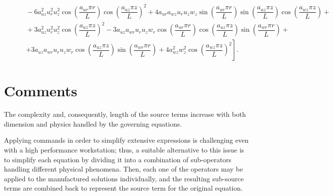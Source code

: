 \documentclass[10pt]{article}
\begin{document}
\begin{equation}
\begin{split}
    &\qquad-6 a_{uz}^2 u_r^2 u_z^2 \cos\left(\dfrac{a_{ur} \pi r}{L}\right) \cos\left(\dfrac{a_{uz} \pi z}{L}\right)^2+4 a_{ur} a_{wz} u_r u_z w_z \sin\left(\dfrac{a_{ur} \pi r}{L}\right) \sin\left(\dfrac{a_{uz} \pi z}{L}\right) \cos\left(\dfrac{a_{wz} \pi z}{L}\right)+\\
    &\qquad+3 a_{uz}^2 u_r^2 u_z^2 \cos\left(\dfrac{a_{uz} \pi z}{L}\right)^2-3 a_{uz} a_{wr} u_r u_z w_r \cos\left(\dfrac{a_{ur} \pi r}{L}\right) \cos\left(\dfrac{a_{uz} \pi z}{L}\right) \sin\left(\dfrac{a_{wr} \pi r}{L}\right)+\\
    &\qquad\left.+3 a_{uz} a_{wr} u_r u_z w_r \cos\left(\dfrac{a_{uz} \pi z}{L}\right) \sin\left(\dfrac{a_{wr} \pi r}{L}\right)+4 a_{wz}^2 w_z^2 \cos\left(\dfrac{a_{wz} \pi z}{L}\right)^2\right] .
\end{split}
\end{equation}



\section{Comments}


The complexity and, consequently, length of the source terms increase with both dimension and physics handled by the governing equations.



Applying commands in order to simplify extensive expressions is challenging even with a high performance workstation; thus, a suitable alternative to this issue is to simplify each equation by dividing it into a combination of sub-operators handling different physical phenomena. Then, each one of the operators may be applied to the manufactured solutions individually, and the resulting sub-source terms are combined back to represent the source term for the original equation.
\end{document}
